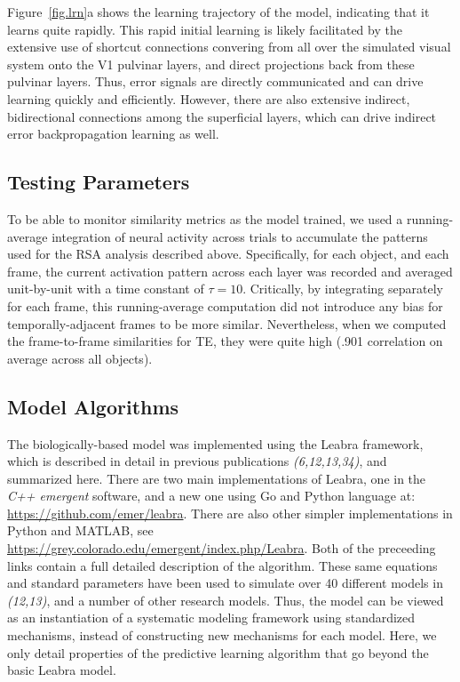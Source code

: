 \documentclass[12pt,twoside]{article}
\newif\myifpdf
\begin{document}
Figure~\ref{fig.lrn}a shows the learning trajectory of the model, indicating that it learns quite rapidly.  This rapid initial learning is likely facilitated by the extensive use of shortcut connections convering from all over the simulated visual system onto the V1 pulvinar layers, and direct projections back from these pulvinar layers.  Thus, error signals are directly communicated and can drive learning quickly and efficiently.  However, there are also extensive indirect, bidirectional connections among the superficial layers, which can drive indirect error backpropagation learning as well.

\subsection{Testing Parameters}

To be able to monitor similarity metrics as the model trained, we used a running-average integration of neural activity across trials to accumulate the patterns used for the RSA analysis described above.  Specifically, for each object, and each frame, the current activation pattern across each layer was recorded and averaged unit-by-unit with a time constant of $\tau = 10$. Critically, by integrating separately for each frame, this running-average computation did not introduce any bias for temporally-adjacent frames to be more similar.  Nevertheless, when we computed the frame-to-frame similarities for TE, they were quite high (.901 correlation on average across all objects).

\subsection{Model Algorithms}

The biologically-based model was implemented using the Leabra framework, which is described in detail in previous publications %
{\em (6,12,13,34)}, and summarized here.  There are two main implementations of Leabra, one in the {\em C++ emergent} software, and a new one using  Go and Python language at: \url{https://github.com/emer/leabra}.  There are also other simpler implementations in Python and MATLAB, see \url{https://grey.colorado.edu/emergent/index.php/Leabra}.   Both of the preceeding links contain a full detailed description of the algorithm.  These same equations and standard parameters have been used to simulate over 40 different models in %
{\em (12,13)}, and a number of other research models.  Thus, the model can be viewed as an instantiation of a systematic modeling framework using standardized mechanisms, instead of constructing new mechanisms for each model.  Here, we only detail properties of the predictive learning algorithm that go beyond the basic Leabra model.
\end{document}
